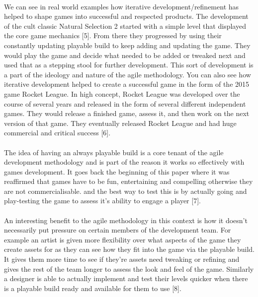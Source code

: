 \documentclass{article}
\begin{document}
\paragraph{}
We can see in real world examples how iterative development/refinement has helped to shape games into successful and respected products. The development of the cult classic Natural Selection 2 started with a simple level that displayed the core game mechanics [5]. From there they progressed by using their constantly updating playable build to keep adding and updating the game. They would play the game and decide what needed to be added or tweaked next and used that as a stepping stool for further development. This sort of development is a part of the ideology and nature of the agile methodology. You can also see how iterative development helped to create a successful game in the form of the 2015 game Rocket League. In high concept, Rocket League was developed over the course of several years and released in the form of several different independent games. They would release a finished game, assess it, and then work on the next version of that game. They eventually released Rocket League and had huge commercial and critical success [6].
\paragraph{}
The idea of having an always playable build is a core tenant of the agile development methodology and is part of the reason it works so effectively with games development. It goes back the beginning of this paper where it was reaffirmed that games have to be fun, entertaining and compelling otherwise they are not commercialisable. and the best way to test this is by actually going and play-testing the game to assess it's ability to engage a player [7].
\paragraph{}
An interesting benefit to the agile methodology in this context is how it doesn't necessarily put pressure on certain members of the development team. For example an artist is given more flexibility over what aspects of the game they create assets for as they can see how they fit into the game via the playable build. It gives them more time to see if they're assets need tweaking or refining and gives the rest of the team longer to assess the look and feel of the game. Similarly a designer is able to actually implement and test their levels quicker when there is a playable build ready and available for them to use [8].
\end{document}

